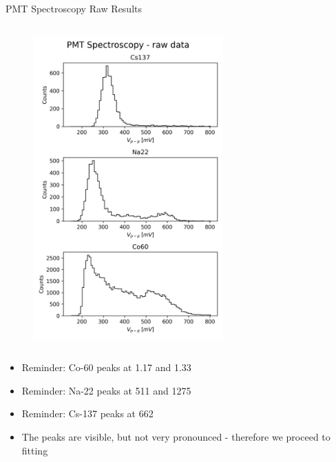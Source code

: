 \begin{columnframe}{PMT Spectroscopy Raw Results}
    \begin{column}{0.5\textwidth}
        \begin{figure}
            \centering
            \includegraphics[width=0.65\textwidth]{images/pmt_raw_spectra.jpg}
        \end{figure}
    \end{column}
    \begin{column}{0.5\textwidth}
        \begin{itemize}
            \item Reminder: Co-60 peaks at 1.17 and 1.33 \MeV
            \item Reminder: Na-22 peaks at 511 \keV and 1275 \keV
            \item Reminder: Cs-137 peaks at 662 \keV
            \item The peaks are visible, but not very pronounced - therefore we proceed to fitting
        \end{itemize}
    \end{column}
\end{columnframe}

